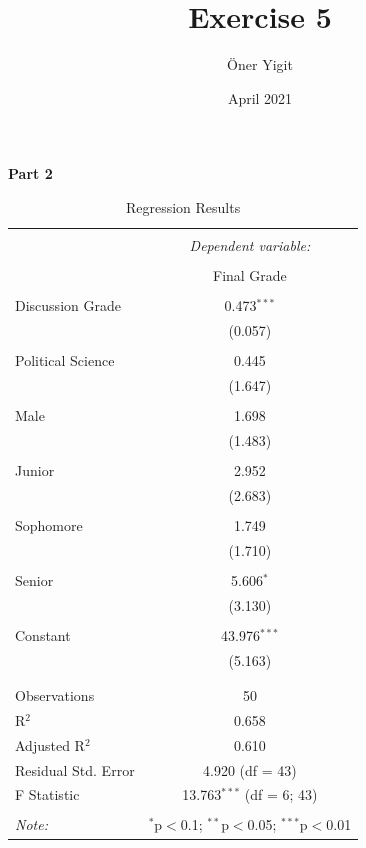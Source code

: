 \documentclass[12pt]{article}
\title{Exercise 5}
\author{Öner Yigit}
\date{April 2021}
\begin{document}
\maketitle
\FloatBarrier
\textbf{Part 2}
\begin{table}[!htbp] \centering 
  \caption{Regression Results} 
  \label{} 
\begin{tabular}{@{\extracolsep{5pt}}lc} 
\\[-1.8ex]\hline 
\hline \\[-1.8ex] 
 & \multicolumn{1}{c}{\textit{Dependent variable:}} \\ 
\cline{2-2} 
\\[-1.8ex] & Final Grade \\ 
\hline \\[-1.8ex] 
 Discussion Grade & 0.473$^{***}$ \\ 
  & (0.057) \\ 
  & \\ 
 Political Science & 0.445 \\ 
  & (1.647) \\ 
  & \\ 
 Male & 1.698 \\ 
  & (1.483) \\ 
  & \\ 
 Junior & 2.952 \\ 
  & (2.683) \\ 
  & \\ 
 Sophomore & 1.749 \\ 
  & (1.710) \\ 
  & \\ 
 Senior & 5.606$^{*}$ \\ 
  & (3.130) \\ 
  & \\ 
 Constant & 43.976$^{***}$ \\ 
  & (5.163) \\ 
  & \\ 
\hline \\[-1.8ex] 
Observations & 50 \\ 
R$^{2}$ & 0.658 \\ 
Adjusted R$^{2}$ & 0.610 \\ 
Residual Std. Error & 4.920 (df = 43) \\ 
F Statistic & 13.763$^{***}$ (df = 6; 43) \\ 
\hline 
\hline \\[-1.8ex] 
\textit{Note:}  & \multicolumn{1}{r}{$^{*}$p$<$0.1; $^{**}$p$<$0.05; $^{***}$p$<$0.01} \\ 
\end{tabular} 
\end{table}
\end{document}
